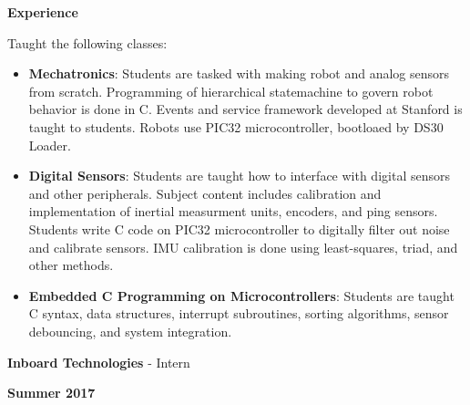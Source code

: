 \documentclass[paper=a4,fontsize=11pt]{article} %
\def \subSectionSpace   {0.3cm}     %
\def \leftColSpace      {0.12}      %
\def \middleColSpace    {0.675}     %
\def \bigMiddleColSpace {0.875}     %
\def \rightColSpace     {0.25}      %
\begin{document}
    \noindent
    \begin{minipage}[t]{\leftColSpace\linewidth}
        \noindent \textbf{Experience}
    \end{minipage}
    \begin{minipage}[t]{\bigMiddleColSpace\linewidth}
        \begin{flushleft}
        \noindent Taught the following classes:
        \begin{itemize}[noitemsep,topsep=0pt]
            \item \textbf{Mechatronics}: Students are tasked with making robot and analog sensors from scratch. Programming of hierarchical statemachine to govern robot behavior is done in C. Events and service framework developed at Stanford is taught to students. Robots use PIC32 microcontroller, bootloaed by DS30 Loader.
            \item \textbf{Digital Sensors}: Students are taught how to interface with digital sensors and other peripherals. Subject content includes calibration and implementation of inertial measurment units, encoders, and ping sensors. Students write C code on PIC32 microcontroller to digitally filter out noise and calibrate sensors. IMU calibration is done using least-squares, triad, and other methods. 
            \item \textbf{Embedded C Programming on Microcontrollers}: Students are taught C syntax, data structures, interrupt subroutines, sorting algorithms, sensor debouncing, and system integration. 
        \end{itemize}
        \end{flushleft}
    \end{minipage}
    \newpage
    \noindent
    \begin{minipage}[t]{\leftColSpace\linewidth}
        \hfill
    \end{minipage}
    \begin{minipage}[t]{\middleColSpace\linewidth}
        \vspace{\subSectionSpace}
        \noindent \textbf{Inboard Technologies} - Intern
    \end{minipage}
    \begin{minipage}[t]{\rightColSpace\linewidth}
        \begin{flushleft}
            \vspace{\subSectionSpace}
            \noindent \textbf{Summer 2017}
        \end{flushleft}
    \end{minipage}
\end{document}
